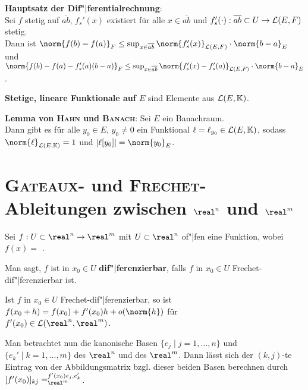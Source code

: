 \textbf{Hauptsatz der Dif"|ferentialrechnung}: \\
Sei $f$ stetig auf $\overline{ab}$,
$f_s'(x)$ existiert für alle $x \in \overline{ab}$ und
$f_s'(\cdot): \overline{ab} \subset U \rightarrow \mathcal{L}(E,F)$ stetig. \\
Dann ist
$\norm{f(b) - f(a)}_F \le \sup_{x \in \overline{ab}}
\norm{f_s'(x)}_{\L(E,F)} \cdot \norm{b - a}_E$ und \\
$\norm{f(b) - f(a) - f_s'(a)(b - a)}_F \le \sup_{x \in \overline{ab}}
\norm{f_s'(x) - f_s'(a)}_{\L(E,F)} \cdot \norm{b - a}_E$.

\linie

\textbf{Stetige, lineare Funktionale auf $E$} sind Elemente aus
$\mathcal{L}(E, \mathbb{K})$.

\textbf{Lemma von \textsc{Hahn} und \textsc{Banach}}:
Sei $E$ ein Banachraum. \\
Dann gibt es für alle $y_0 \in E$, $y_0 \not= 0$
ein Funktional $\ell = \ell_{y_0} \in \mathcal{L}(E, \mathbb{K})$, sodass \\
$\norm{\ell}_{\L(E, \field)} = 1$ und
$|\ell[y_0]| = \norm{y_0}_E$.

\pagebreak

\section{%
    \textsc{Gateaux}- und \textsc{Frechet}-Ableitungen zwischen
    \texorpdfstring{$\real^n$ und $\real^m$}{ℝ\^{}n und ℝ\^{}m}
}

Sei $f: U \subset \real^n \rightarrow \real^m$ mit $U \subset \real^n$ of"|fen
eine Funktion, wobei $f(x) =$
.

Man sagt, $f$ ist in $x_0 \in U$ \textbf{dif"|ferenzierbar},
falls $f$ in $x_0 \in U$ Frechet-dif"|ferenzierbar ist.

\linie

Ist $f$ in $x_0 \in U$ Frechet-dif"|ferenzierbar, so ist
$f(x_0 + h) = f(x_0) + f'(x_0)h + o(\norm{h})$ für \\
$f'(x_0) \in \L(\real^n, \real^m)$.

Man betrachtet nun die kanonische Basen $\{e_j \;|\; j = 1, \dotsc, n\}$ und
$\{e_k' \;|\; k = 1, \dotsc, m\}$ des $\real^n$ und des $\real^m$.
Dann lässt sich der $(k, j)$-te Eintrag von der Abbildungsmatrix bzgl. dieser
beiden Basen berechnen durch
$[f'(x_0)]_{kj} = \sp{f'(x_0)e_j, e_k'}_{\real^m}$.

